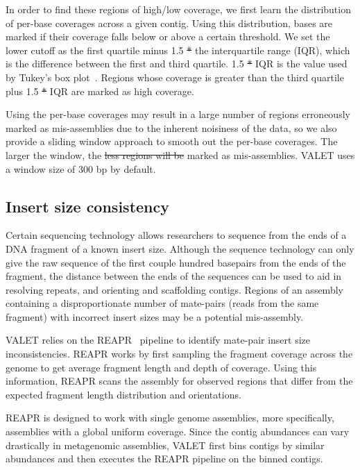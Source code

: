 \documentclass[12pt,\mydriver]{thesis}
\providecommand{\DIFaddtex}[1]{{\protect\color{blue}\uwave{#1}}} %
\providecommand{\DIFdeltex}[1]{{\protect\color{red}\sout{#1}}}                      %
\providecommand{\DIFaddbegin}{} %
\providecommand{\DIFaddend}{} %
\providecommand{\DIFdelbegin}{} %
\providecommand{\DIFdelend}{} %
\providecommand{\DIFadd}[1]{\texorpdfstring{\DIFaddtex{#1}}{#1}} %
\providecommand{\DIFdel}[1]{\texorpdfstring{\DIFdeltex{#1}}{}} %
\begin{document}
In order to find these regions of high/low coverage, we first learn the distribution of per-base coverages across a given contig.  Using this distribution, bases are marked if their coverage falls below or above a certain threshold.  We set the lower cutoff as the first quartile minus 1.5 \DIFdelbegin \DIFdel{* }\DIFdelend \DIFaddbegin \DIFadd{$\times$ }\DIFaddend the interquartile range (IQR), which is the difference between the first and third quartile. 1.5 \DIFdelbegin \DIFdel{* }\DIFdelend \DIFaddbegin \DIFadd{$\times$ }\DIFaddend IQR is the value used by Tukey’s box plot~\cite{mcgill1978variations}.  Regions whose coverage is greater than the third quartile plus 1.5 \DIFdelbegin \DIFdel{* }\DIFdelend \DIFaddbegin \DIFadd{$\times$ }\DIFaddend IQR are marked as high coverage.

Using the per-base coverages may result in a large number of regions erroneously marked as mis-assemblies due to the inherent noisiness of the data, so we also provide a sliding window approach to smooth out the per-base coverages. The larger the window, the \DIFdelbegin \DIFdel{less regions will be }\DIFdelend \DIFaddbegin \DIFadd{fewer the regions }\DIFaddend marked as mis-assemblies.
VALET uses a window size of 300 bp by default.

\subsection{Insert size consistency}
Certain sequencing technology allows researchers to sequence from the ends of a DNA fragment of a known insert size.  Although the sequence technology can only give the raw sequence of the first couple hundred basepairs from the ends of the fragment, the distance between the ends of the sequences can be used to aid in resolving repeats, and orienting and scaffolding contigs.  Regions of an assembly containing a disproportionate number of mate-pairs (reads from the same fragment) with incorrect insert sizes may be a potential mis-assembly.

VALET relies on the REAPR~\cite{hunt2013reapr} pipeline to identify mate-pair insert size inconsistencies.  REAPR works by first sampling the fragment coverage across the genome to get average fragment length and depth of coverage.  Using this information, REAPR scans the assembly for observed regions that differ from the expected fragment length distribution and orientations.

REAPR is designed to work with single genome assemblies, more specifically, assemblies with a global uniform coverage.  Since the contig abundances can vary drastically in metagenomic assemblies, VALET first bins contigs by similar abundances and then executes the REAPR pipeline on the binned contigs.
\end{document}
